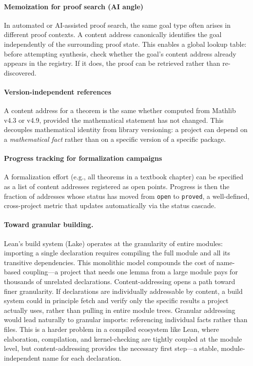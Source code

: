   \paragraph{Memoization for proof search (AI angle)}
  \label{rem:memoization}
  In automated or AI-assisted proof search, the same goal type often
  arises in different proof contexts.  A content address canonically
  identifies the goal independently of the surrounding proof state.
  This enables a global lookup table: before attempting synthesis, check
  whether the goal's content address already appears in the registry.
  If it does, the proof can be retrieved rather than re-discovered.

  \paragraph{Version-independent references}
  \label{rem:versions}
  A content address for a theorem is the same whether computed from
  Mathlib v4.3 or v4.9, provided the mathematical statement has not
  changed.  This decouples mathematical identity from library
  versioning: a project can depend on a \emph{mathematical fact} rather
  than on a specific version of a specific package.

  \paragraph{Progress tracking for formalization campaigns}
  \label{rem:campaigns}
  A formalization effort (e.g., all theorems in a textbook chapter) can
  be specified as a list of content addresses registered as open points.
  Progress is then the fraction of addresses whose status has moved from
  \texttt{open} to \texttt{proved}, a well-defined, cross-project
  metric that updates automatically via the status cascade.

  \paragraph{Toward granular building.}
  Lean's build system (Lake) operates at the granularity of entire
  modules: importing a single declaration requires compiling the full
  module and all its transitive dependencies.  This monolithic model
  compounds the cost of name-based coupling---a project that needs one
  lemma from a large module pays for thousands of unrelated declarations.
  Content-addressing opens a path toward finer granularity.  If
  declarations are individually addressable by content, a build system
  could in principle fetch and verify only the specific results a project
  actually uses, rather than pulling in entire module trees.  Granular
  addressing would lead naturally to granular imports: referencing
  individual facts rather than files.  This is a harder problem in a
  compiled ecosystem like Lean, where elaboration, compilation, and
  kernel-checking are tightly coupled at the module level, but
  content-addressing provides the necessary first step---a stable,
  module-independent name for each declaration.
  
